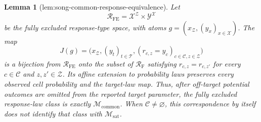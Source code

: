 \documentclass{article}
\newtheorem{lemma}{Lemma}
\begin{document}
\begin{lemma}[lem:song-common-response-equivalence]\label{lem:song-common-response-equivalence}
Let
\[
\mathcal R_{\mathrm{FE}}=\mathcal X^{\mathcal Z}\times\mathcal Y^{\mathcal X}
\]
be the fully excluded response-type space, with atoms \(g=(x_{\mathcal Z},(y_x)_{x\in\mathcal X})\).  The map
\[
J(g)=\bigl(x_{\mathcal Z},(y_t)_{t\in\mathcal T},
(r_{c,z}=y_c)_{c\in\mathcal C,z\in\mathcal Z}\bigr)
\]
is a bijection from \(\mathcal R_{\mathrm{FE}}\) onto the subset of \(\mathcal R_{\mathrm F}\) satisfying \(r_{c,z}=r_{c,z'}\) for every \(c\in\mathcal C\) and \(z,z'\in\mathcal Z\).  Its affine extension to probability laws preserves every observed cell probability and the target-law map.  Thus, after off-target potential outcomes are omitted from the reported target parameter, the fully excluded response-law class is exactly \(\mathcal M_{\mathrm{common}}\).  When \(\mathcal C\ne\varnothing\), this correspondence by itself does not identify that class with \(\mathcal M_{\mathrm{sat}}\).
\end{lemma}
\end{document}
